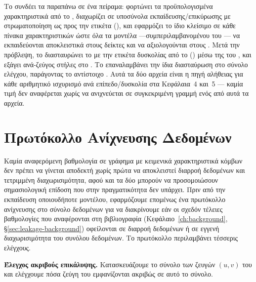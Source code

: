 Το \texttt{} συνδέει τα παραπάνω σε ένα πείραμα: φορτώνει τα
προϋπολογισμένα χαρακτηριστικά από το \texttt{}, διαχωρίζει σε υποσύνολα
εκπαίδευσης/επικύρωσης με στρωματοποίηση ως προς την ετικέτα
(\texttt{}), και εφαρμόζει το ίδιο κλείσιμο \texttt{} σε
κάθε πίνακα χαρακτηριστικών ώστε όλα τα μοντέλα —συμπεριλαμβανομένου του
— να εκπαιδεύονται αποκλειστικά στους δείκτες \texttt{} και να αξιολογούνται
στους \texttt{}. Μετά την πρόβλεψη, το \texttt{} διασταυρώνει το
\texttt{} με την ετικέτα δυσκολίας από το \texttt{}
(\texttt{}) μέσω της \texttt{} του
\texttt{}, και εξάγει ανά-ζεύγος στήλες
\texttt{} στο \texttt{}. Το
\texttt{} επαναλαμβάνει την ίδια διασταύρωση στο σύνολο ελέγχου,
παράγοντας το αντίστοιχο \texttt{}. Αυτά τα δύο αρχεία  είναι η
πηγή αλήθειας για κάθε αριθμητικό ισχυρισμό ανά επίπεδο/δυσκολία στα Κεφάλαια~4
και~5 — καμία τιμή δεν αναφέρεται χωρίς να ανιχνεύεται σε συγκεκριμένη γραμμή ενός
από αυτά τα αρχεία.


\section{Πρωτόκολλο Ανίχνευσης Δεδομένων}
\label{sec:forensics-protocol}

Καμία αναφερόμενη βαθμολογία σε γράφημα με κειμενικά χαρακτηριστικά κόμβων δεν
πρέπει να γίνεται αποδεκτή χωρίς πρώτα να αποκλειστεί διαρροή δεδομένων και
τετριμμένη διαχωρισιμότητα, αφού και τα δύο μπορούν να προσομοιώσουν σημασιολογική
επίδοση που στην πραγματικότητα δεν υπάρχει.
Πριν από την εκπαίδευση οποιουδήποτε μοντέλου, εφαρμόζουμε επομένως ένα πρωτόκολλο
ανίχνευσης στο σύνολο δεδομένων  για να διακρίνουμε εάν οι σχεδόν
τέλειες βαθμολογίες που αναφέρονται στη βιβλιογραφία (Κεφάλαιο~\ref{ch:background},
\S\ref{sec:leakage-background}) οφείλονται σε διαρροή δεδομένων ή σε εγγενή
διαχωρισιμότητα του συνόλου δεδομένων.
Το πρωτόκολλο περιλαμβάνει τέσσερις ελέγχους.

\textbf{Έλεγχος ακριβούς επικάλυψης.} Κατασκευάζουμε το σύνολο των ζευγών $(u, v)$
του \texttt{} και ελέγχουμε πόσα ζεύγη του \texttt{}
εμφανίζονται ακριβώς σε αυτό το σύνολο.

